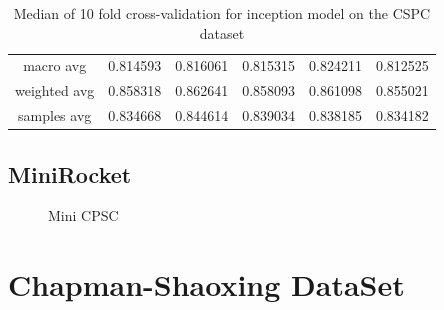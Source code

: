 \documentclass{article}
\begin{document}
\begin{table}[tpb]
\begin{tabular}{|cccccc|}
macro avg                    &                      0.814593 &                     0.816061 &                       0.815315 &                          0.824211 &                             0.812525 \\
weighted avg                 &                      0.858318 &                     0.862641 &                       0.858093 &                          0.861098 &                             0.855021 \\
samples avg                  &                      0.834668 &                     0.844614 &                       0.839034 &                          0.838185 &                             0.834182 \\

\hline
\end{tabular}
\caption{Median of 10 fold cross-validation for inception model on the CSPC dataset}
\label{tab:inception_cspc}
\end{table}
\subsection{MiniRocket}
\begin{figure}[htbp]
  \caption{Mini CPSC}\label{fig:mini_cpsc}
\end{figure}
\section{Chapman-Shaoxing DataSet}
\end{document}
